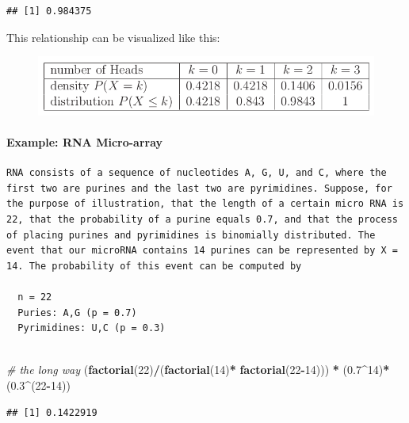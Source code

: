 \documentclass[]{article}
\newenvironment{Shaded}{\begin{snugshade}}{\end{snugshade}}
\newcommand{\KeywordTok}[1]{\textcolor[rgb]{0.13,0.29,0.53}{\textbf{#1}}}
\newcommand{\DecValTok}[1]{\textcolor[rgb]{0.00,0.00,0.81}{#1}}
\newcommand{\FloatTok}[1]{\textcolor[rgb]{0.00,0.00,0.81}{#1}}
\newcommand{\StringTok}[1]{\textcolor[rgb]{0.31,0.60,0.02}{#1}}
\newcommand{\CommentTok}[1]{\textcolor[rgb]{0.56,0.35,0.01}{\textit{#1}}}
\newcommand{\OperatorTok}[1]{\textcolor[rgb]{0.81,0.36,0.00}{\textbf{#1}}}
\newcommand{\NormalTok}[1]{#1}
\let\oldparagraph\paragraph
\renewcommand{\paragraph}[1]{\oldparagraph{#1}\mbox{}}
\begin{document}
\begin{verbatim}
## [1] 0.984375
\end{verbatim}

This relationship can be visualized like this:

\begin{figure}
\centering
\includegraphics{probTable.png}
\caption{}
\end{figure}

\paragraph{Example: RNA Micro-array}\label{example-rna-micro-array}

\begin{verbatim}
RNA consists of a sequence of nucleotides A, G, U, and C, where the first two are purines and the last two are pyrimidines. Suppose, for the purpose of illustration, that the length of a certain micro RNA is 22, that the probability of a purine equals 0.7, and that the process of placing purines and pyrimidines is binomially distributed. The event that our microRNA contains 14 purines can be represented by X = 14. The probability of this event can be computed by

  n = 22
  Puries: A,G (p = 0.7)
  Pyrimidines: U,C (p = 0.3)
  
\end{verbatim}

\begin{Shaded}
\begin{Highlighting}[]
\CommentTok{# the long way}
\NormalTok{(}\KeywordTok{factorial}\NormalTok{(}\DecValTok{22}\NormalTok{)}\OperatorTok{/}\NormalTok{(}\KeywordTok{factorial}\NormalTok{(}\DecValTok{14}\NormalTok{)}\OperatorTok{*}\StringTok{ }\KeywordTok{factorial}\NormalTok{(}\DecValTok{22}\OperatorTok{-}\DecValTok{14}\NormalTok{))) }\OperatorTok{*}\StringTok{ }\NormalTok{(}\FloatTok{0.7}\OperatorTok{^}\DecValTok{14}\NormalTok{)}\OperatorTok{*}\NormalTok{(}\FloatTok{0.3}\OperatorTok{^}\NormalTok{(}\DecValTok{22}\OperatorTok{-}\DecValTok{14}\NormalTok{))}
\end{Highlighting}
\end{Shaded}

\begin{verbatim}
## [1] 0.1422919
\end{verbatim}
\end{document}
